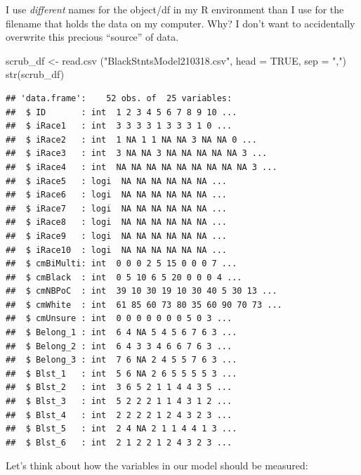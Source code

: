 \documentclass[
  11pt,
]{book}
\newenvironment{Shaded}{\begin{snugshade}}{\end{snugshade}}
\newcommand{\AttributeTok}[1]{\textcolor[rgb]{0.77,0.63,0.00}{#1}}
\newcommand{\ConstantTok}[1]{\textcolor[rgb]{0.00,0.00,0.00}{#1}}
\newcommand{\FunctionTok}[1]{\textcolor[rgb]{0.00,0.00,0.00}{#1}}
\newcommand{\NormalTok}[1]{#1}
\newcommand{\OtherTok}[1]{\textcolor[rgb]{0.56,0.35,0.01}{#1}}
\newcommand{\StringTok}[1]{\textcolor[rgb]{0.31,0.60,0.02}{#1}}
\begin{document}
I use \emph{different} names for the object/df in my R environment than I use for the filename that holds the data on my computer. Why? I don't want to accidentally overwrite this precious ``source'' of data.

\begin{Shaded}
\begin{Highlighting}[]
\NormalTok{scrub\_df }\OtherTok{\textless{}{-}} \FunctionTok{read.csv}\NormalTok{ (}\StringTok{"BlackStntsModel210318.csv"}\NormalTok{, }\AttributeTok{head =} \ConstantTok{TRUE}\NormalTok{, }\AttributeTok{sep =} \StringTok{","}\NormalTok{)}
\FunctionTok{str}\NormalTok{(scrub\_df)}
\end{Highlighting}
\end{Shaded}

\begin{verbatim}
## 'data.frame':    52 obs. of  25 variables:
##  $ ID       : int  1 2 3 4 5 6 7 8 9 10 ...
##  $ iRace1   : int  3 3 3 3 1 3 3 3 1 0 ...
##  $ iRace2   : int  1 NA 1 1 NA NA 3 NA NA 0 ...
##  $ iRace3   : int  3 NA NA 3 NA NA NA NA NA 3 ...
##  $ iRace4   : int  NA NA NA NA NA NA NA NA NA 3 ...
##  $ iRace5   : logi  NA NA NA NA NA NA ...
##  $ iRace6   : logi  NA NA NA NA NA NA ...
##  $ iRace7   : logi  NA NA NA NA NA NA ...
##  $ iRace8   : logi  NA NA NA NA NA NA ...
##  $ iRace9   : logi  NA NA NA NA NA NA ...
##  $ iRace10  : logi  NA NA NA NA NA NA ...
##  $ cmBiMulti: int  0 0 0 2 5 15 0 0 0 7 ...
##  $ cmBlack  : int  0 5 10 6 5 20 0 0 0 4 ...
##  $ cmNBPoC  : int  39 10 30 19 10 30 40 5 30 13 ...
##  $ cmWhite  : int  61 85 60 73 80 35 60 90 70 73 ...
##  $ cmUnsure : int  0 0 0 0 0 0 0 5 0 3 ...
##  $ Belong_1 : int  6 4 NA 5 4 5 6 7 6 3 ...
##  $ Belong_2 : int  6 4 3 3 4 6 6 7 6 3 ...
##  $ Belong_3 : int  7 6 NA 2 4 5 5 7 6 3 ...
##  $ Blst_1   : int  5 6 NA 2 6 5 5 5 5 3 ...
##  $ Blst_2   : int  3 6 5 2 1 1 4 4 3 5 ...
##  $ Blst_3   : int  5 2 2 2 1 1 4 3 1 2 ...
##  $ Blst_4   : int  2 2 2 2 1 2 4 3 2 3 ...
##  $ Blst_5   : int  2 4 NA 2 1 1 4 4 1 3 ...
##  $ Blst_6   : int  2 1 2 2 1 2 4 3 2 3 ...
\end{verbatim}

Let's think about how the variables in our model should be measured:
\end{document}
